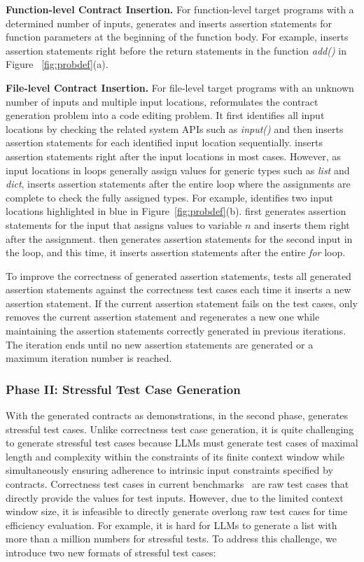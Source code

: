 \textbf{Function-level Contract Insertion.} For function-level target programs with a determined number of inputs, \tool generates and inserts assertion statements for function parameters at the beginning of the function body. For example, \tool inserts assertion statements right before the return statements in the function \textit{add()} in Figure ~\ref{fig:probdef}(a). 


\textbf{File-level Contract Insertion.} For file-level target programs with an unknown number of inputs and multiple input locations, \tool reformulates the contract generation problem into a code editing problem. It first identifies all input locations by checking the related system APIs such as \textit{input()} and then inserts assertion statements for each identified input location sequentially. \tool inserts assertion statements right after the input locations in most cases. However, as input locations in loops generally assign values for generic types such as \textit{list} and \textit{dict}, \tool inserts assertion statements after the entire loop where the assignments are complete to check the fully assigned types. For example, \tool identifies two input locations highlighted in blue in Figure~\ref{fig:probdef}(b). \tool first generates assertion statements for the input that assigns values to variable $n$ and inserts them right after the assignment. \tool then generates assertion statements for the second input in the loop, and this time, it inserts assertion statements after the entire \textit{for} loop. 


To improve the correctness of generated assertion statements, \tool tests all generated assertion statements against the correctness test cases each time it inserts a new assertion statement. If the current assertion statement fails on the test cases, \tool only removes the current assertion statement and regenerates a new one while maintaining the assertion statements correctly generated in previous iterations. The iteration ends until no new assertion statements are generated or a maximum iteration number is reached.



\subsubsection{Phase II: Stressful Test Case Generation}
With the generated contracts as demonstrations, in the second phase, \tool generates stressful test cases. Unlike correctness test case generation, it is quite challenging to generate stressful test cases because LLMs must generate test cases of maximal length and complexity within the constraints of its finite context window while simultaneously ensuring adherence to intrinsic input constraints specified by contracts. Correctness test cases in current benchmarks~\cite{humaneval,mbpp,codecontests,apps} are raw test cases that directly provide the values for test inputs. However, due to the limited context window size, it is infeasible to directly generate overlong raw test cases for time efficiency evaluation. For example, it is hard for LLMs to generate a list with more than a million numbers for stressful tests. To address this challenge, we introduce two new formats of stressful test cases:



